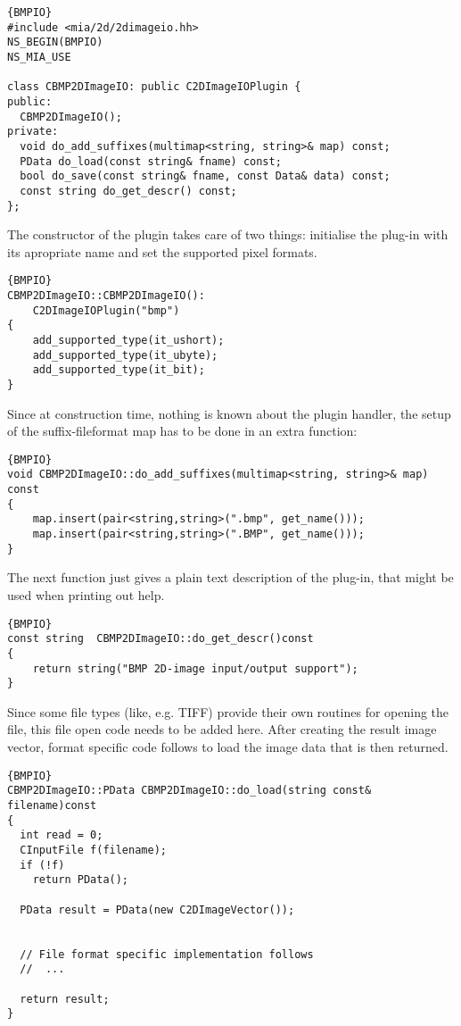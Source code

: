 \documentclass[english, 10pt, a4paper,headsepline,openany]{scrbook}
\begin{document}
\begin{lstlisting}{BMPIO}
#include <mia/2d/2dimageio.hh>
NS_BEGIN(BMPIO)
NS_MIA_USE

class CBMP2DImageIO: public C2DImageIOPlugin {
public:
  CBMP2DImageIO();
private: 
  void do_add_suffixes(multimap<string, string>& map) const;
  PData do_load(const string& fname) const;
  bool do_save(const string& fname, const Data& data) const;
  const string do_get_descr() const; 
};
\end{lstlisting}

\noindent 
The constructor of the plugin takes care of two things: initialise the plug-in with its apropriate name and set the supported pixel formats. 

\begin{lstlisting}{BMPIO}
CBMP2DImageIO::CBMP2DImageIO():
	C2DImageIOPlugin("bmp")
{
	add_supported_type(it_ushort);
	add_supported_type(it_ubyte); 
	add_supported_type(it_bit);
}
\end{lstlisting}

\noindent 
Since at construction time, nothing is known about the plugin handler, 
  the setup of the suffix-fileformat map has to be done in an extra function: 
\begin{lstlisting}{BMPIO}
void CBMP2DImageIO::do_add_suffixes(multimap<string, string>& map) const
{
	map.insert(pair<string,string>(".bmp", get_name())); 
	map.insert(pair<string,string>(".BMP", get_name())); 
}
\end{lstlisting}

\noindent 
The next function just gives a plain text description of the plug-in, that might be used when printing out help. 
\begin{lstlisting}{BMPIO}
const string  CBMP2DImageIO::do_get_descr()const
{
	return string("BMP 2D-image input/output support");
}
\end{lstlisting}

\noindent 
Since some file types (like, e.g. TIFF) provide their own routines for opening the file, this file open code 
  needs to be added here.
After creating the result image vector, format specific code follows to load the image data that is then returned. 
\begin{lstlisting}{BMPIO}
CBMP2DImageIO::PData CBMP2DImageIO::do_load(string const& filename)const
{
  int read = 0; 
  CInputFile f(filename);
  if (!f)
    return PData(); 

  PData result = PData(new C2DImageVector()); 

 
  // File format specific implementation follows
  //  ...
	
  return result; 
}
\end{lstlisting}
\end{document}
